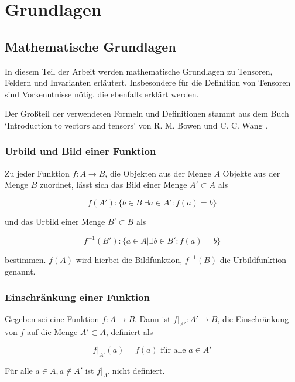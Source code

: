 \documentclass[a4paper,fontsize=12pt,toc=bib,halfparskip]{scrartcl}
\begin{document}
\section{Grundlagen}
\label{sec:Grundlagen}
\subsection{Mathematische Grundlagen}
In diesem Teil der Arbeit werden mathematische Grundlagen zu Tensoren, Feldern und Invarianten erl\"autert. Insbesondere f\"ur die Definition von Tensoren sind Vorkenntnisse n\"otig, die ebenfalls erkl\"art werden. 

Der Gro{\ss}teil der verwendeten Formeln und Definitionen stammt aus dem Buch `Introduction to vectors and tensors' von R. M. Bowen und C. C. Wang \cite{bowen2008introduction}.

\subsubsection{Urbild und Bild einer Funktion}
Zu jeder Funktion $f: A \rightarrow B$, die Objekten aus der Menge $A$ Objekte aus der Menge  $B$ zuordnet, l\"asst sich das Bild einer Menge $A' \subset A$ als

\begin{equation}
	f(A'): \{ b \in B | \exists a \in A' : f(a) = b \}
\end{equation}

und das Urbild einer Menge $B' \subset B$ als

\begin{equation}
	f^{-1}(B'): \{ a \in A | \exists b \in B' : f(a) = b\}
\end{equation}

bestimmen. $f(A)$ wird hierbei die Bildfunktion, $f^{-1}(B)$ die Urbildfunktion genannt. 

\subsubsection{Einschr\"ankung einer Funktion}
Gegeben sei eine Funktion $f: A \rightarrow B$. Dann ist $f|_{A'}: A' \rightarrow B$, die Einschr\"ankung von $f$ auf die Menge $A' \subset A$, definiert als 

\begin{equation}
	f|_{A'}(a) = f(a) \text{ f\"ur alle } a \in A'
\end{equation}

F\"ur alle $a \in A, a \notin A'$ ist $f|_{A'}$ nicht definiert. 
\end{document}
